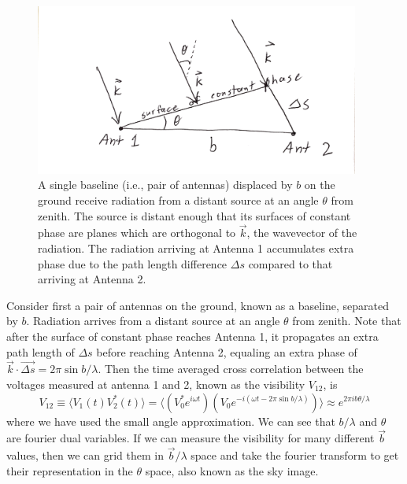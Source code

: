 \begin{figure}[h]
    \centering
    \includegraphics[width=0.95\textwidth]{chap0_intro/radio_interferometer_diagram.png}
    \caption[Diagram of a two element radio interferometer]{A single baseline (i.e., pair of antennas) displaced by $b$ on the ground receive radiation from a distant source at an angle $\theta$ from zenith. The source is distant enough that its surfaces of constant phase are planes which are orthogonal to $\vec{k}$, the wavevector of the radiation. The radiation arriving at Antenna 1 accumulates extra phase due to the path length difference $\Delta s$ compared to that arriving at Antenna 2.}
    \label{fig:radiointerferometerdiagram}
\end{figure}

Consider first a pair of antennas on the ground, known as a baseline, separated by $b$. Radiation arrives from a distant source at an angle $\theta$ from zenith. Note that after the surface of constant phase reaches Antenna 1, it propagates an extra path length of $\Delta s$ before reaching Antenna 2, equaling an extra phase of $\vec{k}\cdot \vec{\Delta s}=2\pi\sin b/\lambda$. Then the time averaged cross correlation between the voltages measured at antenna 1 and 2, known as the visibility $V_{12}$, is
\begin{equation}
	V_{12}\equiv\langle V_1(t)V_2^*(t)\rangle=\langle(V_0^* e^{i\omega t})(V_0e^{-i(\omega t-2\pi\sin b/\lambda)})\rangle \approx e^{2\pi i b\theta/\lambda}
\end{equation}
where we have used the small angle approximation. We can see that $b/\lambda$ and $\theta$ are fourier dual variables. If we can measure the visibility for many different $\vec{b}$ values, then we can grid them in $\vec{b}/\lambda$ space and take the fourier transform to get their representation in the $\theta$ space, also known as the sky image.

